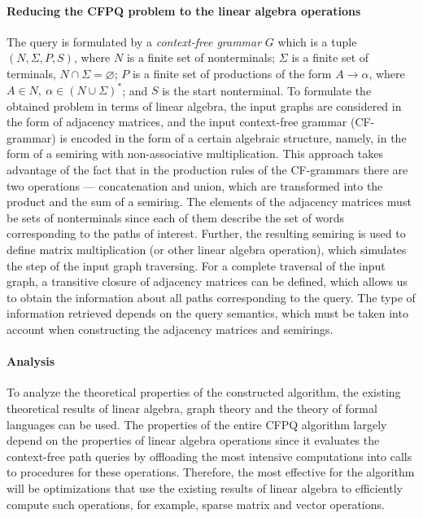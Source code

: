 \documentclass[sigconf, nonacm]{acmart}
\begin{document}
\paragraph{Reducing the CFPQ problem to the linear algebra operations} 
The query is formulated by a \emph{context-free grammar} $G$ which is a tuple $(N, \Sigma, P, S)$, where $N$ is a finite set of nonterminals; $\Sigma$ is a finite set of terminals, $N \cap \Sigma = \varnothing$; $P$ is a finite set of productions of the form $A \to \alpha$, where $A \in N,\ \alpha \in (N \cup \Sigma)^*$; and $S$ is the start nonterminal. To formulate the obtained problem in terms of linear algebra, the input graphs are considered in the form of adjacency matrices, and the input context-free grammar (CF-grammar) is encoded in the form of a certain algebraic structure, namely, in the form of a semiring with non-associative multiplication. This approach takes advantage of the fact that in the production rules of the CF-grammars there are two operations --- concatenation and union, which are transformed into the product and the sum of a semiring. The elements of the adjacency matrices must be sets of nonterminals since each of them describe the set of words corresponding to the paths of interest. Further, the resulting semiring is used to define matrix multiplication (or other linear algebra operation), which simulates the step of the input graph traversing. For a complete traversal of the input graph, a transitive closure of adjacency matrices can be defined, which allows us to obtain the information about all paths corresponding to the query. The type of information retrieved depends on the query semantics, which must be taken into account when constructing the adjacency matrices and semirings.


\paragraph{Analysis}
To analyze the theoretical properties of the constructed algorithm, the existing theoretical results of linear algebra, graph theory and the theory of formal languages can be used. The properties of the entire CFPQ algorithm largely depend on the properties of linear algebra operations since it evaluates the context-free path queries by offloading the most intensive computations into calls
to procedures for these operations. Therefore, the most effective for the algorithm will be optimizations that use the existing results of linear algebra to efficiently compute such operations, for example, sparse matrix and vector operations.
\end{document}
